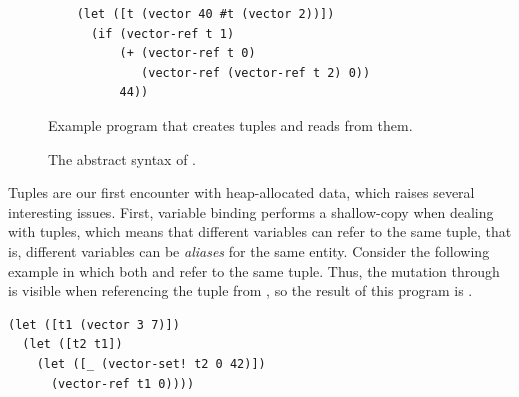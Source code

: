 \documentclass[11pt]{book}
\newcommand{\gray}[1]{{\color{gray} #1}}
\begin{document}
\begin{figure}[tbp]
\begin{lstlisting}
    (let ([t (vector 40 #t (vector 2))])
      (if (vector-ref t 1)
          (+ (vector-ref t 0)
             (vector-ref (vector-ref t 2) 0))
          44))
\end{lstlisting}
\caption{Example program that creates tuples and reads from them.}
\label{fig:vector-eg}
\end{figure}

\begin{figure}[tp]
\centering
\fbox{
\begin{minipage}{0.96\textwidth}
\[
\begin{array}{lcl}
  \itm{op} &::=& \ldots \mid \code{vector} \mid \code{vector-length} \\
\Exp &::=& \gray{ \INT{\Int} \mid \VAR{\Var} \mid \LET{\Var}{\Exp}{\Exp} } \\
     &\mid& \gray{ \PRIM{\itm{op}}{\Exp\ldots}
      \mid \BOOL{\itm{bool}}
      \mid \IF{\Exp}{\Exp}{\Exp} } \\
    &\mid& \VECREF{\Exp}{\INT{\Int}}\\
    &\mid& \VECSET{\Exp}{\INT{\Int}}{\Exp} \\
     &\mid& \VOID{} \mid \LP\key{HasType}~\Exp~\Type \RP \\
  \LangVec{} &::=& \PROGRAM{\key{'()}}{\Exp}
\end{array}
\]
\end{minipage}
}
\caption{The abstract syntax of \LangVec{}.}
\label{fig:Rvec-syntax}
\end{figure}

Tuples are our first encounter with heap-allocated data, which raises
several interesting issues. First, variable binding performs a
shallow-copy when dealing with tuples, which means that different
variables can refer to the same tuple, that is, different variables
can be \emph{aliases} for the same entity. Consider the following
example in which both  and  refer to the same tuple.
Thus, the mutation through  is visible when referencing the
tuple from , so the result of this program is .
\begin{center}
\begin{minipage}{0.96\textwidth}
\begin{lstlisting}
(let ([t1 (vector 3 7)])
  (let ([t2 t1])
    (let ([_ (vector-set! t2 0 42)])
      (vector-ref t1 0))))
\end{lstlisting}
\end{minipage}
\end{center}
\end{document}
